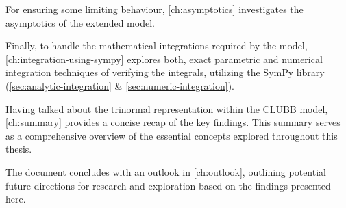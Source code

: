 For ensuring some limiting behaviour,
\cref{ch:asymptotics} investigates the asymptotics of the extended model.

Finally, to handle the mathematical integrations required by the model,
\cref{ch:integration-using-sympy} explores both,
exact parametric and numerical integration techniques of verifying the integrals,
utilizing the SymPy library (\cref{sec:analytic-integration} \& \cref{sec:numeric-integration}).

Having talked about the trinormal representation within the \gls{CLUBB} model,
\cref{ch:summary} provides a concise recap of the key findings.
This summary serves as a comprehensive overview of the essential concepts
explored throughout this thesis.

The document concludes with an outlook in \cref{ch:outlook},
outlining potential future directions for research
and exploration based on the findings presented here.
